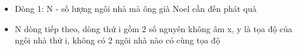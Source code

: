 \begin{itemize}
	\item Dòng 1: N - số lượng ngôi nhà mà ông già Noel cần đến phát quà
	\item N dòng tiếp theo, dòng thứ i gồm 2 số nguyên không âm x, y là tọa độ của ngôi nhà thứ i, không có 2 ngôi nhà nào có cùng tọa độ
\end{itemize}